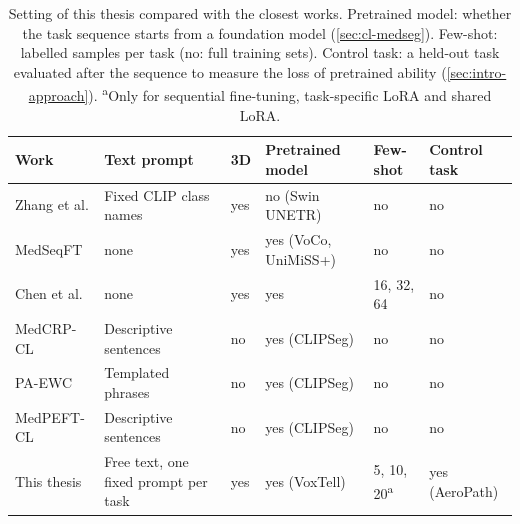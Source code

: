 \begin{table}[!tb]
\centering
\footnotesize
\setlength{\tabcolsep}{2.5pt}
\renewcommand{\arraystretch}{1.1}
\caption[Setting of this thesis compared with the closest works]{Setting of this thesis compared with the closest works. Pretrained model: whether the task sequence starts from a foundation model (\cref{sec:cl-medseg}). Few-shot: labelled samples per task (no: full training sets). Control task: a held-out task evaluated after the sequence to measure the loss of pretrained ability (\cref{sec:intro-approach}). \textsuperscript{a}Only for sequential fine-tuning, task-specific LoRA and shared LoRA.}
\label{tab:positioning}
\begin{tabularx}{\linewidth}{@{}L{3.9cm}L{3.3cm}L{0.6cm}L{3.4cm}L{1.6cm}>{\raggedright\arraybackslash}X@{}}
\toprule
\textbf{Work} & \textbf{Text prompt} & \textbf{3D} & \textbf{Pretrained model} & \textbf{Few-shot} & \textbf{Control task}\\
\midrule
Zhang et al. \mbox{}\cite{zhang2023continuallearningabdominalmultiorgan} & Fixed CLIP class names & yes & no (Swin UNETR) & no & no\\
MedSeqFT \mbox{}\cite{ye2025medseqft} & none & yes & yes (VoCo, UniMiSS+) & no & no\\
Chen et al. \mbox{}\cite{chen2026fewshotcontinuallearning3d} & none & yes & yes & 16, 32, 64 & no\\
MedCRP-CL \mbox{}\cite{gao2026medcrpcl} & Descriptive sentences & no & yes (CLIPSeg) & no & no\\
PA-EWC \mbox{}\cite{gao2025paewc} & Templated phrases & no & yes (CLIPSeg) & no & no\\
MedPEFT-CL \mbox{}\cite{gao2026medpeftcl} & Descriptive sentences & no & yes (CLIPSeg) & no & no\\
\midrule
This thesis & Free text, one fixed prompt per task & yes & yes (VoxTell) & 5, 10, 20\textsuperscript{a} & yes (AeroPath)\\
\bottomrule
\end{tabularx}
\end{table}
